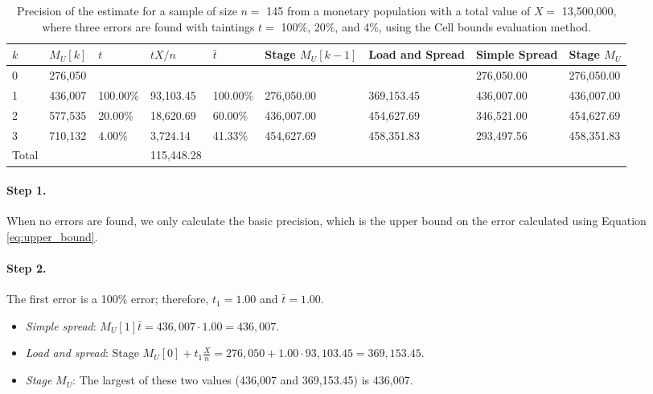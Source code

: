 \begin{table}
\begin{tabularx}{\textheight}{X Y Y Y Y Y Y Y Y}
\toprule
\parbox[t]{0.8 cm}{$k$} &
$M_U[k]$ &
$t$ &
$t X / n$ &
$\bar{t}$ &
Stage $M_U[k - 1]$ &
Load and Spread &
Simple Spread &
Stage $M_U$ \\

\midrule

0 & 276,050 & & & & & & 276,050.00 & 276,050.00 \\
1 & 436,007 & 100.00\% & 93,103.45 & 100.00\% & 276,050.00 & 369,153.45 & 436,007.00 & 436,007.00 \\
2 & 577,535 & 20.00\% & 18,620.69 & 60.00\% & 436,007.00 & 454,627.69 & 346,521.00 & 454,627.69 \\
3 & 710,132 & 4.00\% & 3,724.14 & 41.33\% & 454,627.69 & 458,351.83 & 293,497.56 & 458,351.83 \\

\midrule

Total & & & 115,448.28 \\

\bottomrule
\end{tabularx}
\caption{Precision of the estimate for a sample of size $n =$ 145 from a monetary population with a total value of $X =$ 13,500,000, where three errors are found with taintings $t =$ 100\%, 20\%, and 4\%, using the Cell bounds evaluation method.}
\label{tab:precision_Cell}
\end{table}

\paragraph{Step 1.} When no errors are found, we only calculate the basic precision, which is the upper bound on the error calculated using Equation \ref{eq:upper_bound}. 

\paragraph{Step 2.} The first error is a 100\% error; therefore, $t_1 = 1.00$ and $\bar{t} = 1.00$.

\begin{itemize}
\item \emph{Simple spread}: $M_U[1] \bar{t} = 436,007 \cdot 1.00 = 436,007$.
\item \emph{Load and spread}: Stage $M_U[0] + t_1 \frac{X}{n} = 276,050 + 1.00 \cdot 93,103.45 = 369,153.45$.
\item \emph{Stage} $M_U$: The largest of these two values (436,007 and 369,153.45) is 436,007.
\end{itemize}

